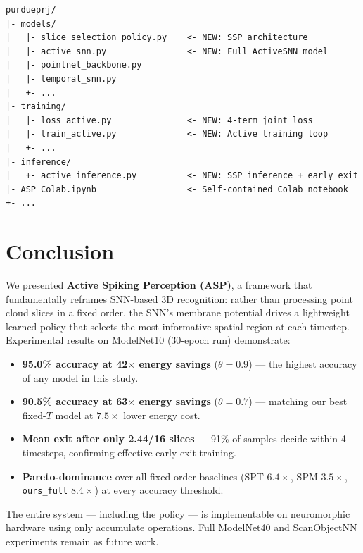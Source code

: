 \documentclass[11pt,a4paper]{article}
\begin{document}
\begin{lstlisting}
purdueprj/
|- models/
|   |- slice_selection_policy.py    <- NEW: SSP architecture
|   |- active_snn.py                <- NEW: Full ActiveSNN model
|   |- pointnet_backbone.py
|   |- temporal_snn.py
|   +- ...
|- training/
|   |- loss_active.py               <- NEW: 4-term joint loss
|   |- train_active.py              <- NEW: Active training loop
|   +- ...
|- inference/
|   +- active_inference.py          <- NEW: SSP inference + early exit
|- ASP_Colab.ipynb                  <- Self-contained Colab notebook
+- ...
\end{lstlisting}

\section{Conclusion}

We presented \textbf{Active Spiking Perception (ASP)}, a framework that
fundamentally reframes SNN-based 3D recognition: rather than processing point
cloud slices in a fixed order, the SNN's membrane potential drives a lightweight
learned policy that selects the most informative spatial region at each timestep.
Experimental results on ModelNet10 (30-epoch run) demonstrate:

\begin{itemize}
  \item \textbf{95.0\% accuracy at 42$\times$ energy savings} ($\theta{=}0.9$)
        --- the highest accuracy of any model in this study.
  \item \textbf{90.5\% accuracy at 63$\times$ energy savings} ($\theta{=}0.7$)
        --- matching our best fixed-$T$ model at $7.5\times$ lower energy cost.
  \item \textbf{Mean exit after only 2.44/16 slices} --- 91\% of samples decide
        within 4 timesteps, confirming effective early-exit training.
  \item \textbf{Pareto-dominance} over all fixed-order baselines
        (SPT $6.4\times$, SPM $3.5\times$, \texttt{ours\_full} $8.4\times$)
        at every accuracy threshold.
\end{itemize}

The entire system --- including the policy --- is implementable on neuromorphic
hardware using only accumulate operations. Full ModelNet40 and ScanObjectNN
experiments remain as future work.
\end{document}
